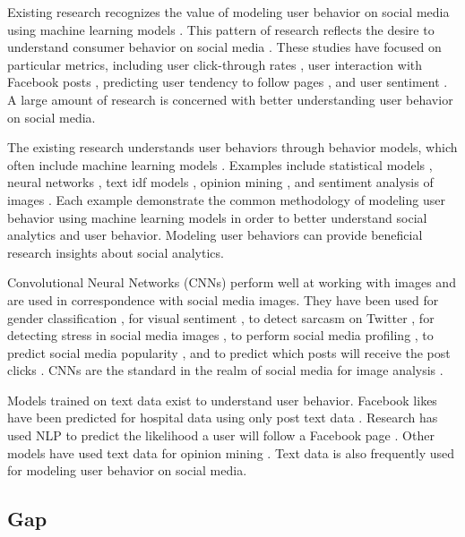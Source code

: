 \documentclass[mksc,blindrev]{informs3} %
\begin{document}
Existing research recognizes the value of modeling user behavior on social media using machine learning models \cite{Li2015, 8029313, Ohsawa2013, Liu2012, Li2015}. This pattern of research reflects the desire to understand consumer behavior on social media \cite{Fisher2009}. These studies have focused on particular metrics, including user click-through rates \cite{Li2015}, user interaction with Facebook posts \cite{8029313}, predicting user tendency to follow pages \cite{Ohsawa2013}, and user sentiment \cite{Liu2012,Wang2015}. A large amount of research is concerned with better understanding user behavior on social media.

The existing research understands user behaviors through behavior models, which often include machine learning models \cite{Li2015, 8029313, Ohsawa2013, Liu2012, Li2015}.  Examples include statistical models \cite{Li2015}, neural networks \cite{8029313}, text idf models \cite{Ohsawa2013}, opinion mining \cite{Liu2012}, and sentiment analysis of images \cite{Wang2015}. Each  example demonstrate the common methodology of modeling user behavior using machine learning models in order to better understand social analytics and user behavior. Modeling user behaviors can provide beneficial research insights about social analytics.

Convolutional Neural Networks (CNNs) perform well at working with images and are used in correspondence with social media images. They have been used for gender classification \cite{Hassner2015}, for visual sentiment \cite{Segalin2017, Xu2014}, to detect sarcasm on Twitter \cite{Poria2016}, for detecting stress in social media images \cite{Lin2014}, to perform social media profiling \cite{Segalin2017}, to predict social media popularity \cite{Gelli2015}, and to predict which posts will receive the post clicks \cite{Khosla2014}. CNNs are the standard in the realm of social media for image analysis \cite{Hassner2015}. 

Models trained on text data exist to understand user behavior. Facebook likes have been predicted for hospital data using only post text data \cite{8029313}. Research has used NLP to predict the likelihood a user will follow a Facebook page \cite{Ohsawa2013}. Other models have used text data for opinion mining \cite{Liu2012}. Text data is also frequently used for modeling user behavior on social media.

\subsection{Gap}
\end{document}
